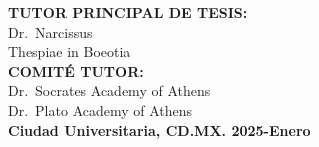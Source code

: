\documentclass[
  10pt]{article}
\renewcommand*\contentsname{Tabla de contenidos}
\newcommand\contentsname{Tabla de contenidos}
\renewcommand*\listfigurename{Listado de Figuras}
\newcommand\listfigurename{Listado de Figuras}
\renewcommand*\listtablename{Listado de Tablas}
\newcommand\listtablename{Listado de Tablas}
\begin{document}
\begin{titlepage}
\begin{center}
        {\small \textbf{TUTOR PRINCIPAL DE TESIS:}}\\
        {\small  Dr.~Narcissus }\\
        {\small  Thespiae in Boeotia }\\[0.5cm]
        
        {\small \textbf{COMITÉ TUTOR:}}\\
        {\small  Dr.~Socrates } {\small  Academy of Athens }\\
        {\small  Dr.~Plato } {\small  Academy of Athens }\\
        
        \vfill
                {\small \textbf{{Ciudad Universitaria,
CD.MX.} \hfill {2025-Enero}}}\\
                
    \end{center}
\end{titlepage}

\newpage
\begin{center}
\end{center}

\newpage


\newpage
\begin{center}
\end{center}

\newpage


\newpage
\begin{center}
\end{center}

\newpage


\newpage
\begin{center}
\end{center}


\renewcommand*\contentsname{Tabla de contenidos}
\newpage
\tableofcontents

\newpage


\renewcommand{\listfigurename}{Lista de figuras}
\renewcommand{\listtablename}{Lista de tablas}
\listoffigures
\listoftables
\end{document}

